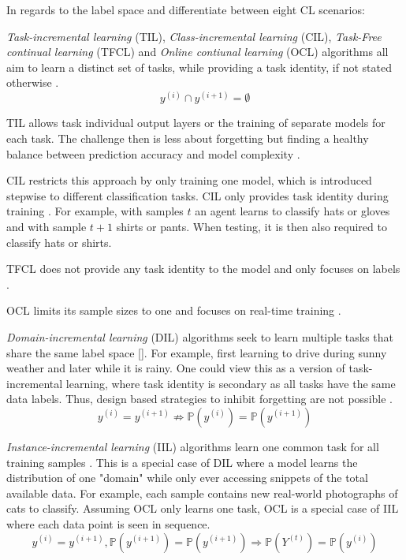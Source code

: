 In regards to the label space \citeauthor{bidaki2025} \cite{bidaki2025} and \citeauthor{LW} \cite{LW} differentiate between eight CL scenarios:

\textit{Task-incremental learning} (TIL), \textit{Class-incremental learning} (CIL), \textit{Task-Free continual learning} (TFCL) and \textit{Online contiunal learning} (OCL) algorithms all aim to learn a distinct set of tasks, while providing a task identity, if not stated otherwise \cite{bidaki2025, LW}.
\begin{equation}
	y^{(i)} \cap y^{(i+1)} = \emptyset
\end{equation}

TIL allows task individual output layers or the training of separate models for each task. The challenge then is less about forgetting but finding a healthy balance between prediction accuracy and model complexity \cite{vandeVen2022}.

CIL restricts this approach by only training one model, which is introduced stepwise to different classification tasks. CIL only provides task identity during training \cite{vandeVen2022}. For example, with samples $t$ an agent learns to classify hats or gloves and with sample $t+1$ shirts or pants. When testing, it is then also required to classify hats or shirts.

TFCL does not provide any task identity to the model and only focuses on labels \cite{aljundi2019tfcl}.

OCL limits its sample sizes to one and focuses on real-time training \cite{bidaki2025, LW}.

\textit{Domain-incremental learning} (DIL) algorithms seek to learn multiple tasks that share the same label space []. For example, first learning to drive during sunny weather and later while it is rainy. One could view this as a version of task-incremental learning, where task identity is secondary as all tasks have the same data labels. Thus, design based strategies to inhibit forgetting are not possible \cite{vandeVen2022}.
\begin{equation}
	y^{(i)}=y^{(i+1)} \nRightarrow \mathbb{P}(y^{(i)}) = \mathbb{P}(y^{(i+1)})
\end{equation}

\textit{Instance-incremental learning} (IIL) algorithms learn one common task for all training samples \cite{bidaki2025, LW}.
This is a special case of DIL where a model learns the distribution of one "domain" while only ever accessing snippets of the total available data. For example, each sample contains new real-world photographs of cats to classify. Assuming OCL only learns one task, OCL is a special case of IIL where each data point is seen in sequence.
\begin{equation}
	y^{(i)}=y^{(i+1)}, \mathbb{P}(y^{(i+1)}) = \mathbb{P}(y^{(i+1)}) \Rightarrow \mathbb{P}(Y^{(t)})=\mathbb{P}(y^{(i)})
\end{equation}

